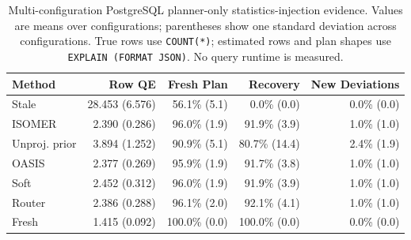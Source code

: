 \begin{table}[t]
  \centering
  \small
  \caption{Multi-configuration PostgreSQL planner-only statistics-injection evidence. Values are means over configurations; parentheses show one standard deviation across configurations. True rows use \texttt{COUNT(*)}; estimated rows and plan shapes use \texttt{EXPLAIN (FORMAT JSON)}. No query runtime is measured.}
  \label{tab:postgres_planner_stats_injection_batch}
  \setlength{\tabcolsep}{5pt}
  \begin{tabular}{lrrrr}
    \toprule
    Method & Row QE & Fresh Plan & Recovery & New Deviations \\
    \midrule
    Stale & 28.453 (6.576) & 56.1\% (5.1) & 0.0\% (0.0) & 0.0\% (0.0) \\
    ISOMER & 2.390 (0.286) & 96.0\% (1.9) & 91.9\% (3.9) & 1.0\% (1.0) \\
    Unproj. prior & 3.894 (1.252) & 90.9\% (5.1) & 80.7\% (14.4) & 2.4\% (1.9) \\
    OASIS & 2.377 (0.269) & 95.9\% (1.9) & 91.7\% (3.8) & 1.0\% (1.0) \\
    Soft & 2.452 (0.312) & 96.0\% (1.9) & 91.9\% (3.9) & 1.0\% (1.0) \\
    Router & 2.386 (0.288) & 96.1\% (2.0) & 92.1\% (4.1) & 1.0\% (1.0) \\
    Fresh & 1.415 (0.092) & 100.0\% (0.0) & 100.0\% (0.0) & 0.0\% (0.0) \\
    \bottomrule
  \end{tabular}
\end{table}
